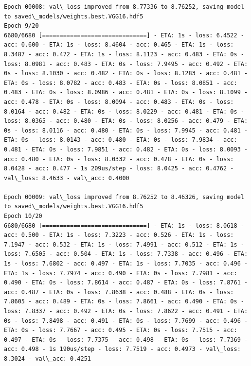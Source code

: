 \documentclass[11pt]{article}
\begin{document}
\begin{Verbatim}[commandchars=\\\{\}]
Epoch 00008: val\_loss improved from 8.77336 to 8.76252, saving model to saved\_models/weights.best.VGG16.hdf5
Epoch 9/20
6680/6680 [==============================] - ETA: 1s - loss: 6.4522 - acc: 0.600 - ETA: 1s - loss: 8.4604 - acc: 0.465 - ETA: 1s - loss: 8.3487 - acc: 0.472 - ETA: 1s - loss: 8.1123 - acc: 0.483 - ETA: 0s - loss: 8.0981 - acc: 0.483 - ETA: 0s - loss: 7.9495 - acc: 0.492 - ETA: 0s - loss: 8.1030 - acc: 0.482 - ETA: 0s - loss: 8.1283 - acc: 0.481 - ETA: 0s - loss: 8.0782 - acc: 0.483 - ETA: 0s - loss: 8.0851 - acc: 0.483 - ETA: 0s - loss: 8.0986 - acc: 0.481 - ETA: 0s - loss: 8.1099 - acc: 0.478 - ETA: 0s - loss: 8.0094 - acc: 0.483 - ETA: 0s - loss: 8.0164 - acc: 0.482 - ETA: 0s - loss: 8.0229 - acc: 0.481 - ETA: 0s - loss: 8.0365 - acc: 0.480 - ETA: 0s - loss: 8.0256 - acc: 0.479 - ETA: 0s - loss: 8.0116 - acc: 0.480 - ETA: 0s - loss: 7.9945 - acc: 0.481 - ETA: 0s - loss: 8.0143 - acc: 0.480 - ETA: 0s - loss: 7.9834 - acc: 0.481 - ETA: 0s - loss: 7.9851 - acc: 0.482 - ETA: 0s - loss: 8.0093 - acc: 0.480 - ETA: 0s - loss: 8.0332 - acc: 0.478 - ETA: 0s - loss: 8.0428 - acc: 0.477 - 1s 209us/step - loss: 8.0425 - acc: 0.4762 - val\_loss: 8.4633 - val\_acc: 0.4000

Epoch 00009: val\_loss improved from 8.76252 to 8.46326, saving model to saved\_models/weights.best.VGG16.hdf5
Epoch 10/20
6680/6680 [==============================] - ETA: 1s - loss: 8.0618 - acc: 0.500 - ETA: 1s - loss: 7.3223 - acc: 0.526 - ETA: 1s - loss: 7.1947 - acc: 0.532 - ETA: 1s - loss: 7.4991 - acc: 0.512 - ETA: 1s - loss: 7.6505 - acc: 0.504 - ETA: 1s - loss: 7.7338 - acc: 0.496 - ETA: 1s - loss: 7.6802 - acc: 0.497 - ETA: 1s - loss: 7.7035 - acc: 0.496 - ETA: 1s - loss: 7.7974 - acc: 0.490 - ETA: 0s - loss: 7.7981 - acc: 0.490 - ETA: 0s - loss: 7.8614 - acc: 0.487 - ETA: 0s - loss: 7.8761 - acc: 0.487 - ETA: 0s - loss: 7.8638 - acc: 0.488 - ETA: 0s - loss: 7.8605 - acc: 0.489 - ETA: 0s - loss: 7.8661 - acc: 0.490 - ETA: 0s - loss: 7.8337 - acc: 0.492 - ETA: 0s - loss: 7.8622 - acc: 0.491 - ETA: 0s - loss: 7.8498 - acc: 0.491 - ETA: 0s - loss: 7.7699 - acc: 0.496 - ETA: 0s - loss: 7.7667 - acc: 0.495 - ETA: 0s - loss: 7.7515 - acc: 0.497 - ETA: 0s - loss: 7.7375 - acc: 0.498 - ETA: 0s - loss: 7.7369 - acc: 0.498 - 1s 190us/step - loss: 7.7519 - acc: 0.4973 - val\_loss: 8.3024 - val\_acc: 0.4251


\end{Verbatim}
\end{document}
